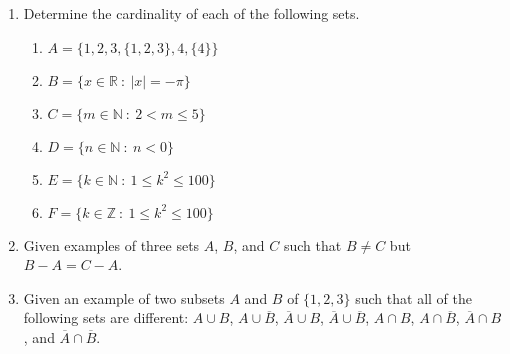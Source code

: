 \documentclass[12pt]{article}
\newcommand{\RR}{{\mathbb R}}  %
\newcommand{\NN}{{\mathbb N}}  %
\newcommand{\ZZ}{{\mathbb Z}}  %
\newcommand{\sep}{{\ :\ }}     %
\begin{document}
\begin{enumerate}
\begin{enumerate}
  \end{enumerate}

\item Determine the cardinality of each of the following sets.

  \begin{enumerate}
  \item  $A=\{1,2,3,\{1,2,3\},4,\{4\}\}$

  \item  $B=\{x\in\RR \sep  |x|=-\pi\}$

  \item $C=\{m\in\NN \sep  2<m\leq 5\}$

  \item $D=\{n\in\NN \sep  n<0\}$

  \item $E=\{k\in\NN \sep  1\leq k^2\leq 100\}$

  \item $F=\{k\in\ZZ \sep  1\leq k^2\leq 100\}$

  \end{enumerate}

\item Given examples of three sets $A$, $B$, and $C$ such that $B\neq C$ but $B-A=C-A$.

\item Given an example of two subsets $A$ and $B$ of $\{1,2,3\}$ such that all of the following sets are different:
  $A\cup B$, $A\cup\overline{B}$, $\overline{A}\cup B$,     $\overline{A}\cup\overline{B}$,
  $A\cap B$, $A\cap\overline{B}$, $\overline{A}\cap B$, and $\overline{A}\cap\overline{B}$.

\end{enumerate}  
\end{document}
